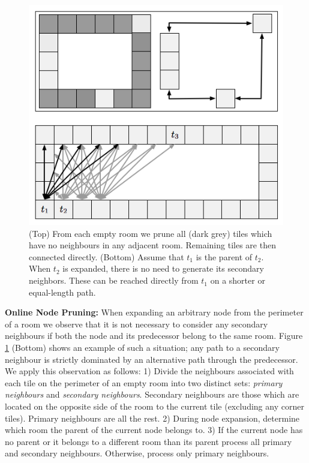 \begin{figure}[t]
	\begin{center}
	\includegraphics[scale=0.45, trim = 10mm 10mm 10mm 0mm]
	{diagrams/branching.png}
	\end{center}
	\vspace{-3pt}
	\caption{(Top) From each empty room we prune all (dark grey) tiles which
	have no neighbours in any adjacent room.
	Remaining tiles are then connected directly.
	(Bottom) Assume that $t_{1}$ is the parent of $t_2$. When $t_2$
	is expanded, there is no need to generate its secondary neighbors.
	These can be reached directly from $t_1$ on a shorter or equal-length path.
}
\label{fig-branching}
\end{figure}

\noindent
\textbf{Online Node Pruning:} 
When expanding an arbitrary node from the perimeter of a room we observe that
it is not necessary to consider any secondary neighbours if both the node
and its predecessor belong to the same room. Figure \ref{fig-branching} (Bottom) shows an 
example of such a situation; any path to a secondary neighbour is strictly
dominated by an alternative path through the predecessor.
We apply this observation as follows:
1) {Divide the neighbours associated with each tile on the perimeter of an empty room into two distinct sets:
\emph{primary neighbours} and \emph{secondary neighbours}.
Secondary neighbours are those which are located on the opposite side of the
room to the current tile  (excluding any corner tiles).
Primary neighbours are all the rest.}
2) {During node expansion, determine which room the parent of the current node belongs to.}
3) {If the current node has no parent or it belongs to a different room than
its parent process all primary and secondary neighbours. Otherwise, process only primary neighbours.}


